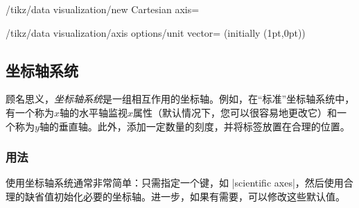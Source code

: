 \begin{key}{/tikz/data visualization/new Cartesian axis=}
\begin{key}{/tikz/data visualization/axis options/unit vector= (initially {(1pt,0pt)})}
\begin{codeexample}[preamble={\usetikzlibrary{datavisualization}}]
\end{codeexample}
    \end{key}
\end{key}


\subsection{坐标轴系统}
\label{section-dv-axis-systems}


顾名思义，\emph{坐标轴系统}是一组相互作用的坐标轴。例如，在``标准''坐标轴系统中，有一个称为$x$轴的水平轴监视$x$属性（默认情况下，您可以很容易地更改它）和一个称为$y$轴的垂直轴。此外，添加一定数量的刻度，并将标签放置在合理的位置。


\subsubsection{用法}


使用坐标轴系统通常非常简单：只需指定一个键，如 |scientific axes|，然后使用合理的缺省值初始化必要的坐标轴。进一步，如果有需要，可以修改这些默认值。


